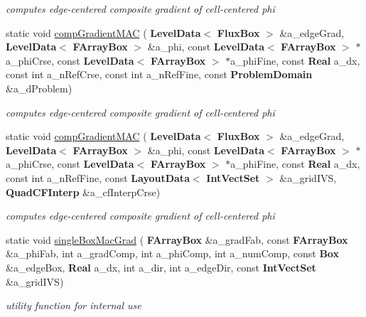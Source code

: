 \begin{DoxyCompactItemize}
\begin{DoxyCompactList}\small\item\em computes edge-\/centered composite gradient of cell-\/centered phi \end{DoxyCompactList}\item 
static void \hyperlink{class_gradient_ab53c80ecc42d684acd3456c47b4db5f2}{comp\+Gradient\+M\+AC} (\textbf{ Level\+Data}$<$ \textbf{ Flux\+Box} $>$ \&a\+\_\+edge\+Grad, \textbf{ Level\+Data}$<$ \textbf{ F\+Array\+Box} $>$ \&a\+\_\+phi, const \textbf{ Level\+Data}$<$ \textbf{ F\+Array\+Box} $>$ $\ast$a\+\_\+phi\+Crse, const \textbf{ Level\+Data}$<$ \textbf{ F\+Array\+Box} $>$ $\ast$a\+\_\+phi\+Fine, const \textbf{ Real} a\+\_\+dx, const int a\+\_\+n\+Ref\+Crse, const int a\+\_\+n\+Ref\+Fine, const \textbf{ Problem\+Domain} \&a\+\_\+d\+Problem)
\begin{DoxyCompactList}\small\item\em computes edge-\/centered composite gradient of cell-\/centered phi \end{DoxyCompactList}\item 
static void \hyperlink{class_gradient_a82e5e91499de8d5cbddf3c42528c9421}{comp\+Gradient\+M\+AC} (\textbf{ Level\+Data}$<$ \textbf{ Flux\+Box} $>$ \&a\+\_\+edge\+Grad, \textbf{ Level\+Data}$<$ \textbf{ F\+Array\+Box} $>$ \&a\+\_\+phi, const \textbf{ Level\+Data}$<$ \textbf{ F\+Array\+Box} $>$ $\ast$a\+\_\+phi\+Crse, const \textbf{ Level\+Data}$<$ \textbf{ F\+Array\+Box} $>$ $\ast$a\+\_\+phi\+Fine, const \textbf{ Real} a\+\_\+dx, const int a\+\_\+n\+Ref\+Fine, const \textbf{ Layout\+Data}$<$ \textbf{ Int\+Vect\+Set} $>$ \&a\+\_\+grid\+I\+VS, \textbf{ Quad\+C\+F\+Interp} \&a\+\_\+cf\+Interp\+Crse)
\begin{DoxyCompactList}\small\item\em computes edge-\/centered composite gradient of cell-\/centered phi \end{DoxyCompactList}\item 
\mbox{\label{class_gradient_a54d7c331f9bf1ee1b95f6683b5ef4ca3}} 
static void \hyperlink{class_gradient_a54d7c331f9bf1ee1b95f6683b5ef4ca3}{single\+Box\+Mac\+Grad} (\textbf{ F\+Array\+Box} \&a\+\_\+grad\+Fab, const \textbf{ F\+Array\+Box} \&a\+\_\+phi\+Fab, int a\+\_\+grad\+Comp, int a\+\_\+phi\+Comp, int a\+\_\+num\+Comp, const \textbf{ Box} \&a\+\_\+edge\+Box, \textbf{ Real} a\+\_\+dx, int a\+\_\+dir, int a\+\_\+edge\+Dir, const \textbf{ Int\+Vect\+Set} \&a\+\_\+grid\+I\+VS)
\begin{DoxyCompactList}\small\item\em utility function for internal use \end{DoxyCompactList}\item 

\end{DoxyCompactItemize}

